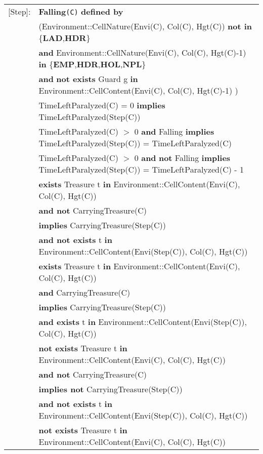 \documentclass[7pt]{article}
\begin{document}
\begin{tabular}{rl}

\textrm{[Step]}: & \textbf{Falling}\texttt{(C)} \textbf{defined by} \\ 
&\quad\quad (Environment::CellNature(Envi(C), Col(C), Hgt(C)) \textbf{not in} \{\textbf{LAD},\textbf{HDR}\}  \\
&\quad\quad \textbf{and} Environment::CellNature(Envi(C), Col(C), Hgt(C)-1) \textbf{in} \{\textbf{EMP},\textbf{HDR},\textbf{HOL},\textbf{NPL}\}  \\
& \quad\quad \textbf{and} \textbf{not exists} Guard g \textbf{in} Environment::CellContent(Envi(C), Col(C), Hgt(C)-1) )\\
&  TimeLeftParalyzed(C) = 0 \textbf{implies} TimeLeftParalyzed(Step(C))\\
&  TimeLeftParalyzed(C) $>$ 0 \textbf{and} Falling \textbf{implies} TimeLeftParalyzed(Step(C)) = TimeLeftParalyzed(C)\\
&  TimeLeftParalyzed(C) $>$ 0 \textbf{and} \textbf{not} Falling \textbf{implies} TimeLeftParalyzed(Step(C)) = TimeLeftParalyzed(C) - 1\\
& \textbf{exists} Treasure t \textbf{in} Environment::CellContent(Envi(C), Col(C), Hgt(C)) \\ 
& \quad \textbf{and not} CarryingTreasure(C) \\ 
& \quad \textbf{implies} CarryingTreasure(Step(C)) \\
& \quad\quad \textbf{and not exists} t \textbf{in} Environment::CellContent(Envi(Step(C)), Col(C), Hgt(C)) \\ 
& \textbf{exists} Treasure t \textbf{in} Environment::CellContent(Envi(C), Col(C), Hgt(C)) \\ 
& \quad \textbf{and} CarryingTreasure(C) \\ 
& \quad \textbf{implies} CarryingTreasure(Step(C)) \\
& \quad\quad \textbf{and exists} t \textbf{in} Environment::CellContent(Envi(Step(C)), Col(C), Hgt(C)) \\
& \textbf{not exists} Treasure t \textbf{in} Environment::CellContent(Envi(C), Col(C), Hgt(C)) \\ 
& \quad \textbf{and not} CarryingTreasure(C) \\ 
& \quad \textbf{implies not} CarryingTreasure(Step(C)) \\
& \quad\quad \textbf{and not exists} t \textbf{in} Environment::CellContent(Envi(Step(C)), Col(C), Hgt(C)) \\
& \textbf{not exists} Treasure t \textbf{in} Environment::CellContent(Envi(C), Col(C), Hgt(C)) \\ 

\end{tabular}
\end{document}
